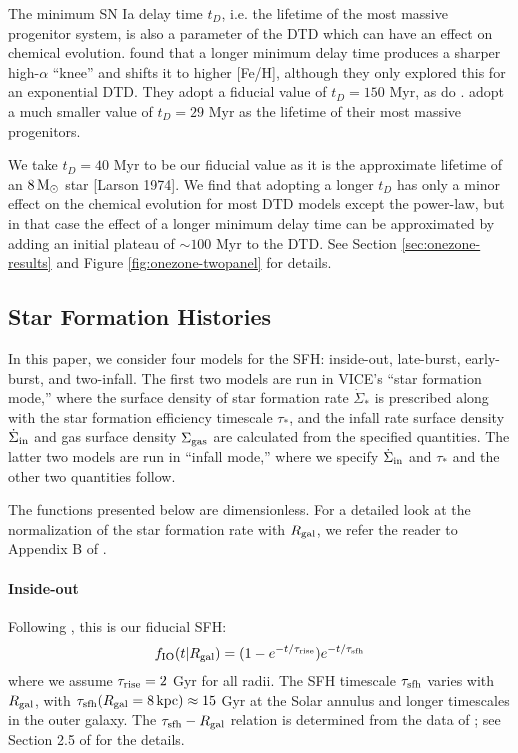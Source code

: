 \documentclass[modern,linenumbers]{aastex631}
\begin{document}
The minimum SN Ia delay time $t_D$, i.e. the lifetime of the most massive progenitor system, is also a parameter of the DTD which can have an effect on chemical evolution. \citet{Andrews2017-ChemicalEvolution} found that a longer minimum delay time produces a sharper high-$\alpha$ ``knee'' and shifts it to higher [Fe/H], although they only explored this for an exponential DTD. They adopt a fiducial value of $t_D=150$ Myr, as do \citet{Johnson2021-Migration}. \citet{Poulhazan2018-PrecisionPollution} adopt a much smaller value of $t_D=29$ Myr as the lifetime of their most massive progenitors.

We take $t_D=40$ Myr to be our fiducial value as it is the approximate lifetime of an $8\,{\rm M}_\odot$ star [Larson 1974]. We find that adopting a longer $t_D$ has only a minor effect on the chemical evolution for most DTD models except the power-law, but in that case the effect of a longer minimum delay time can be approximated by adding an initial plateau of $\sim100$ Myr to the DTD. See Section \ref{sec:onezone-results} and Figure \ref{fig:onezone-twopanel} for details.

\subsection{Star Formation Histories}
\label{sec:sfh}

In this paper, we consider four models for the SFH: inside-out, late-burst, early-burst, and two-infall. The first two models are run in VICE's ``star formation mode,'' where the surface density of star formation rate $\dot\Sigma_*$ is prescribed along with the star formation efficiency timescale $\tau_*$, and the infall rate surface density $\dot\Sigma_{\rm in}$ and gas surface density $\Sigma_{\rm gas}$ are calculated from the specified quantities. The latter two models are run in ``infall mode,'' where we specify $\dot\Sigma_{\rm in}$  and $\tau_*$ and the other two quantities follow. 

The functions presented below are dimensionless. For a detailed look at the normalization of the star formation rate with $R_{\rm gal}$, we refer the reader to Appendix B of \citet{Johnson2021-Migration}.

\paragraph{Inside-out} Following \citet{Johnson2021-Migration}, this is our fiducial SFH:
\begin{equation}
    f_{\rm IO}(t|R_{\rm gal}) = (1 - e^{-t/\tau_{\rm rise}}) e^{-t/\tau_{\rm sfh}}
    \label{eq:insideout-sfh}
\end{equation}
where we assume $\tau_{\rm rise}=2$ Gyr for all radii. The SFH timescale $\tau_{\rm sfh}$ varies with $R_{\rm gal}$, with $\tau_{\rm sfh}(R_{\rm gal}=8\,\rm{kpc})\approx15$ Gyr at the Solar annulus and longer timescales in the outer galaxy. The $\tau_{\rm sfh} - R_{\rm gal}$ relation is determined from the data of \citet{Sanchez2020-StarFormationTimescales}; see Section 2.5 of \citet{Johnson2021-Migration} for the details.
\end{document}
